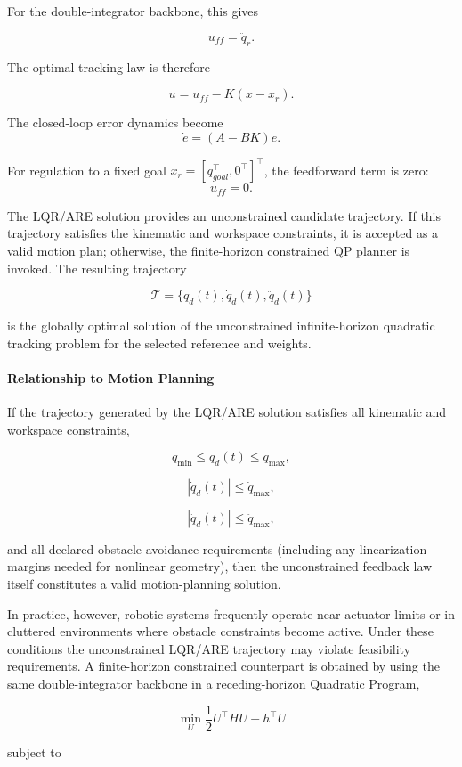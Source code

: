 For the double-integrator backbone, this gives

\[u_{ff} = \ddot q_r. \]

The optimal tracking law is therefore

\[u = u_{ff} - K(x-x_r).\]

The closed-loop error dynamics become \[\dot e = (A-BK)e.\]

For regulation to a fixed goal \(x_r=[q_{goal}^\top,0^\top]^\top\), the
feedforward term is zero: \[u_{ff}=0.\]

The LQR/ARE solution provides an unconstrained candidate trajectory. If
this trajectory satisfies the kinematic and workspace constraints, it is
accepted as a valid motion plan; otherwise, the finite-horizon
constrained QP planner is invoked. The resulting trajectory

\[ \mathcal T = \{q_d(t),\dot q_d(t),\ddot q_d(t)\}\]

is the globally optimal solution of the unconstrained infinite-horizon
quadratic tracking problem for the selected reference and weights.

\paragraph{Relationship to Motion
Planning}\label{relationship-to-motion-planning}

If the trajectory generated by the LQR/ARE solution satisfies all
kinematic and workspace constraints,

\[ q_{\min} \le q_d(t) \le q_{\max}, \]

\[ |\dot q_d(t)| \le \dot q_{\max}, \]

\[|\ddot q_d(t)| \le \ddot q_{\max},\]

and all declared obstacle-avoidance requirements (including any
linearization margins needed for nonlinear geometry), then the
unconstrained feedback law itself constitutes a valid motion-planning
solution.

In practice, however, robotic systems frequently operate near actuator
limits or in cluttered environments where obstacle constraints become
active. Under these conditions the unconstrained LQR/ARE trajectory may
violate feasibility requirements. A finite-horizon constrained
counterpart is obtained by using the same double-integrator backbone in
a receding-horizon Quadratic Program,

\[ \min_U \frac12 U^\top H U + h^\top U \]

subject to

